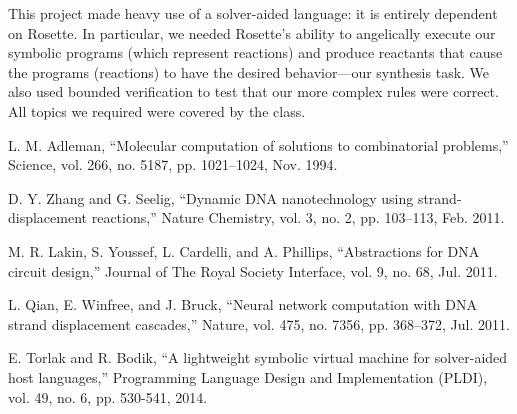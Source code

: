\documentclass{article}
\begin{document}
This project made heavy use of a solver-aided language: it is entirely dependent
on Rosette. In particular, we needed Rosette's ability to angelically execute
our symbolic programs (which represent reactions) and produce reactants that
cause the programs (reactions) to have the desired behavior---our synthesis
task. We also used bounded verification to test that our more complex
rules were correct. All topics we required were covered by the class.

\begin{thebibliography}{9}

L. M. Adleman,
“Molecular computation of solutions to combinatorial problems,”
Science, vol. 266, no. 5187, pp. 1021–1024, Nov. 1994.

D. Y. Zhang and G. Seelig,
“Dynamic DNA nanotechnology using strand-displacement reactions,”
Nature Chemistry, vol. 3, no. 2, pp. 103–113, Feb. 2011.

M. R. Lakin, S. Youssef, L. Cardelli, and A. Phillips,
“Abstractions for DNA circuit design,”
Journal of The Royal Society Interface, vol. 9, no. 68, Jul. 2011.

L. Qian, E. Winfree, and J. Bruck, “Neural network computation with DNA strand
displacement cascades,” Nature, vol. 475, no. 7356, pp. 368–372, Jul. 2011.

  E. Torlak and R. Bodik, “A lightweight symbolic virtual machine for solver-aided host languages,” Programming Language Design and Implementation (PLDI), vol. 49, no. 6, pp. 530-541, 2014.

\end{thebibliography}
\end{document}
